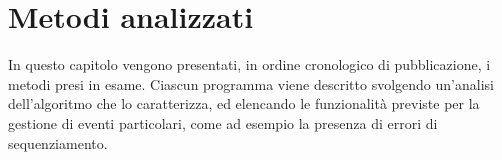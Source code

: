 \documentclass[a4paper, 12pt, final, openright, titlepage, twoside]{book}
\begin{document}
	
	
	\frontmatter
	
	
	
	
	
	\mainmatter
	
	\chapter{Metodi analizzati}
	In questo capitolo vengono presentati, in ordine cronologico di pubblicazione, i metodi presi in esame. Ciascun programma viene descritto svolgendo un'analisi dell'algoritmo che lo caratterizza, ed elencando le funzionalità previste per la gestione di eventi particolari, come ad esempio la presenza di errori di sequenziamento. 
	
	
	
	
	
	
	
	
	
	
	\backmatter
	
	
	
\end{document}
